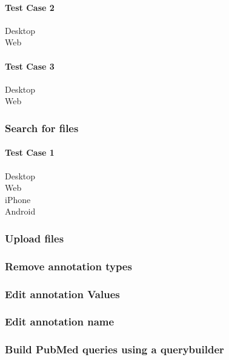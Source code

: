 \paragraph*{Test Case 2}
\begin{description}
 \item[Desktop]
 \item[Web]
\end{description}
\paragraph*{Test Case 3}
\begin{description}
 \item[Desktop]
 \item[Web]
\end{description}
\subsubsection{Search for files}
\paragraph*{Test Case 1}
\begin{description}
 \item[Desktop]
 \item[Web]
 \item[iPhone]
 \item[Android]
\end{description}

\subsubsection{Upload files}
\subsubsection{Remove annotation types}
\subsubsection{Edit annotation Values}
\subsubsection{Edit annotation name}
\subsubsection{Build PubMed queries using a querybuilder}